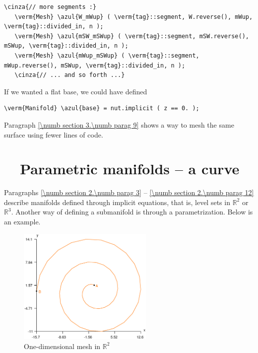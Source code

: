 \begin{Verbatim}[commandchars=\\\{\},formatcom=\small\tt,frame=single,
   label=parag-\ref{\numb section 2.\numb parag 12}.cpp,rulecolor=\color{coment},
   baselinestretch=0.94,framesep=2mm]
   \cinza{// more segments :}
   \verm{Mesh} \azul{W_mWup} ( \verm{tag}::segment, W.reverse(), mWup, \verm{tag}::divided_in, n );
   \verm{Mesh} \azul{mSW_mSWup} ( \verm{tag}::segment, mSW.reverse(), mSWup, \verm{tag}::divided_in, n );
   \verm{Mesh} \azul{mWup_mSWup} ( \verm{tag}::segment, mWup.reverse(), mSWup, \verm{tag}::divided_in, n );
   \cinza{// ... and so forth ...}
\end{Verbatim}

If we wanted a flat base, we could have defined

\begin{Verbatim}[commandchars=\\\{\},formatcom=\small\tt,baselinestretch=0.94]
   \verm{Manifold} \azul{base} = nut.implicit ( z == 0. );
\end{Verbatim}

Paragraph \ref{\numb section 3.\numb parag 9} shows a way to mesh the same surface using
fewer lines of code.


\section{~~Parametric manifolds -- a curve}\label{\numb section 2.\numb parag 13}

Paragraphs \ref{\numb section 2.\numb parag 3} -- \ref{\numb section 2.\numb parag 12} describe
manifolds defined through implicit equations, that is, level sets in $ \mathbb{R}^2 $ or
$ \mathbb{R}^3 $.
Another way of defining a submanifold is through a parametrization.
Below is an example.

\begin{figure}[ht] \centering
  \includegraphics[width=65mm]{spiral}
  \caption{One-dimensional mesh in $ {\mathbb R}^2 $}
\end{figure}

